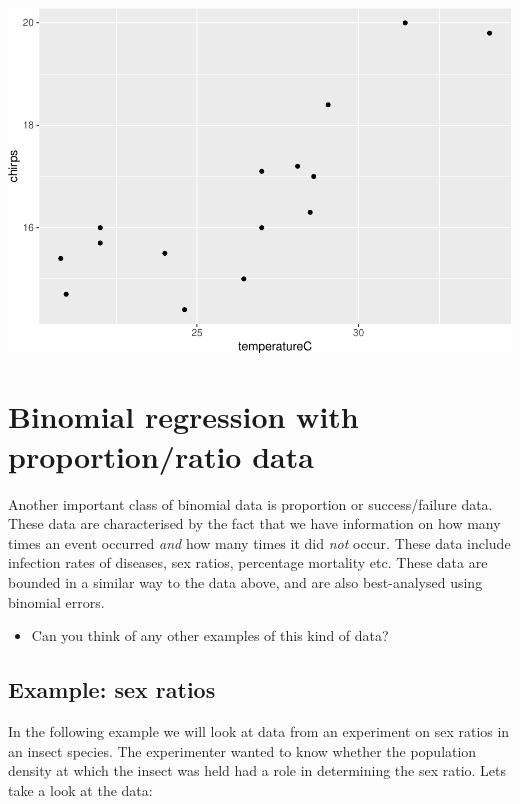 \documentclass[
  a4paperpaper,
]{book}
\providecommand{\tightlist}{%
  \setlength{\itemsep}{0pt}\setlength{\parskip}{0pt}}
\begin{document}
\includegraphics{BB852_files/figure-latex/unnamed-chunk-248-1.pdf}

\hypertarget{binomial-regression-with-proportionratio-data}{%
\section{Binomial regression with proportion/ratio data}\label{binomial-regression-with-proportionratio-data}}

Another important class of binomial data is proportion or success/failure data. These data are characterised by the fact that we have information on how many times an event occurred \emph{and} how many times it did \emph{not} occur. These data include infection rates of diseases, sex ratios, percentage mortality etc. These data are bounded in a similar way to the data above, and are also best-analysed using binomial errors.

\begin{itemize}
\tightlist
\item
  Can you think of any other examples of this kind of data?
\end{itemize}

\hypertarget{example-sex-ratios}{%
\subsection{Example: sex ratios}\label{example-sex-ratios}}

In the following example we will look at data from an experiment on sex ratios in an insect species. The experimenter wanted to know whether the population density at which the insect was held had a role in determining the sex ratio. Lets take a look at the data:
\end{document}
